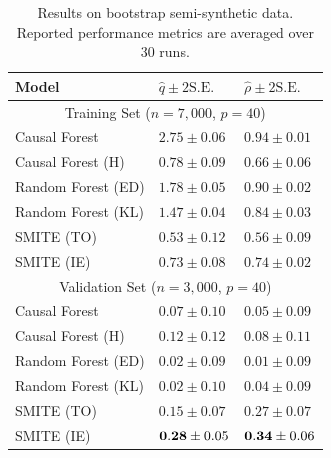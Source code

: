 \begin{table}[]
    \caption{Results on bootstrap semi-synthetic data. Reported performance metrics are averaged over $30$ runs. }
    \centering
    \begin{tabular}{|p{2.9cm}||p{2.1cm}|p{1.8cm}|}
         \hline
         Model &  $\hat{q} \pm 2\mathrm{S.E.}$ & $\hat{\rho} \pm 2\mathrm{S.E.}$\\
         \hline
         \multicolumn{3}{|c|}{Training Set ($n=7,000$, $p=40$)} \\
         \hline
         Causal Forest   & $2.75 \pm 0.06 $ & $0.94 \pm 0.01$ \\
         Causal Forest (H) & $0.78 \pm 0.09 $ & $0.66 \pm  0.06$ \\
         Random Forest (ED) & $1.78 \pm 0.05$ & $0.90 \pm 0.02$ \\
         Random Forest (KL) & $1.47 \pm 0.04$ & $ 0.84 \pm 0.03$ \\
         SMITE (TO) &$0.53 \pm 0.12$  &$ 0.56 \pm 0.09$ \\
         SMITE (IE) &$0.73 \pm 0.08$  & $0.74 \pm 0.02$\\
         \hline
         \multicolumn{3}{|c|}{Validation Set ($n=3,000$, $p=40$)} \\
         \hline
         Causal Forest & $0.07 \pm 0.10 $ & $0.05 \pm 0.09$ \\
         Causal Forest (H) & $0.12 \pm 0.12$ & $0.08 \pm 0.11$ \\
         Random Forest (ED) & $0.02 \pm 0.09$ & $0.01 \pm 0.09$ \\
         Random Forest (KL) & $0.02 \pm 0.10$ & $0.04 \pm 0.09$ \\
         SMITE (TO) &$0.15 \pm 0.07$  &$0.27 \pm 0.07$  \\
         SMITE (IE) & $\bold{0.28} \pm 0.05$ &$\bold{0.34} \pm 0.06$ \\
         \hline
    \end{tabular}
    \label{tab:boot_perf}
\end{table}